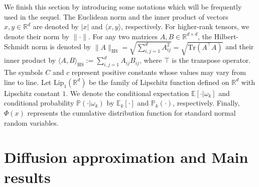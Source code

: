 \documentclass[12pt]{amsart}
\theoremstyle{definition}
\theoremstyle{remark}
\numberwithin{equation}{section}
\newcommand{\E}{\mathbb{E}}            %
\newcommand{\Ll}{\langle}
\newcommand{\Rr}{\rangle}
\newcommand{\R}{\mathbb{R}}\newcommand{\RR}{\mathbb{R}}
\newcommand{\red}{\color{red}}
\begin{document}
We finish this section by introducing some notations which will be frequently used in the sequel. The Euclidean norm and the inner product of vectors $x, y \in \R^d$ are denoted by $|x|$ and $\langle x, y \rangle$, respectively. For higher-rank tensors, we denote their norm by $\|\cdot\|$. For any two matrices $A,B\in \R^{d\times d}$, the Hilbert-Schmidt norm is denoted by
$\|A\|_{\text{HS}}=\sqrt{\sum_{i,j=1}^d A_{ij}^2}=\sqrt{\textrm{Tr}(A^\top A)}$ and their inner product by 
$\Ll A,B\Rr_{\text{HS}}:=\sum_{i,j=1}^d A_{ij}B_{ij}$, where $\top$ is the transpose operator. The symbols $C$ and $c$ represent positive constants whose values may vary from line to line. Let $\text{Lip}_1(\R^d)$ be the family of Lipschitz function defined on $\R^d$ with Lipschitz constant $1$. We denote the conditional expectation $\E[\cdot|\omega_k]$ and conditional probability $\mathbb{P}(\cdot|\omega_k)$ by $\E_k[\cdot]$ and  $\mathbb{P}_k(\cdot)$, respectively. Finally, $\Phi(x)$ represents the cumulative distribution function for standard normal random variables.



	

\section{Diffusion approximation and Main results}\label{sec:2}

\end{document}
